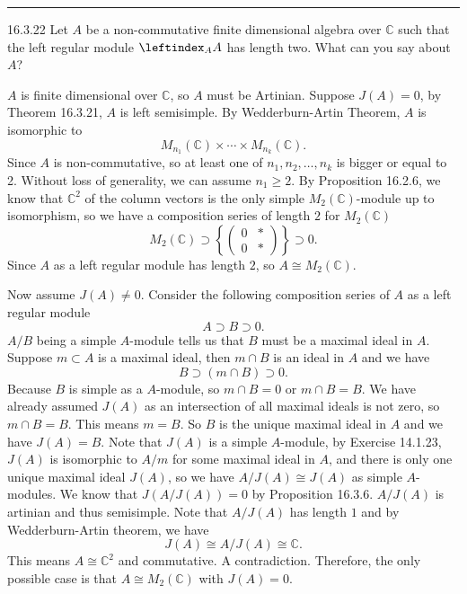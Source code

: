 \documentclass[a4paper, 12pt]{article}
\begin{document}
\noindent\rule{7in}{2.8pt}
\begin{problem}{16.3.22}
Let \(A\) be a non-commutative finite dimensional algebra over \(\mathbb{C}\) such that the left regular module \(\leftindex_A A\) has length two. What can you say about \(A\)?
\end{problem}
\begin{solution}
\(A\) is finite dimensional over \(\mathbb{C}\), so \(A\) must be Artinian. Suppose \(J(A)=0\), by Theorem 16.3.21, \(A\) is left semisimple. By Wedderburn-Artin Theorem, \(A\) is isomorphic to 
\[M_{n_1}(\mathbb{C})\times\cdots\times M_{n_k}(\mathbb{C}).\]
Since \(A\) is non-commutative, so at least one of \(n_1,n_2,\ldots,n_k\) is bigger or equal to 2. Without loss of generality, we can assume \(n_1\geq 2\). By Proposition 16.2.6, we know that \(\mathbb{C}^2\) of the column vectors is the only 
simple \(M_2(\mathbb{C})\)-module up to isomorphism, so we have a composition series of length \(2\) for \(M_2(\mathbb{C})\) 
\[M_2(\mathbb{C})\supset \left\{ \begin{pmatrix}
0&*\\ 
0&*
\end{pmatrix} \right\}\supset 0.\]
Since \(A\) as a left regular module has length \(2\), so \(A\cong M_2(\mathbb{C})\). 

Now assume \(J(A)\neq 0\). Consider the following composition series of \(A\) as a left regular module
\[A\supset B\supset 0.\]
\(A/B\) being a simple \(A\)-module tells us that \(B\) must be a maximal ideal in \(A\). Suppose \(m\subset A\) is a maximal ideal, then \(m\cap B\) is an ideal in \(A\) and we have 
\[B\supset (m\cap B)\supset 0.\]
Because \(B\) is simple as a \(A\)-module, so \(m\cap B=0\) or \(m\cap B=B\). We have already assumed \(J(A)\) as an intersection of all maximal ideals is not zero, so \(m\cap B=B\). This means \(m=B\). So \(B\) is the unique maximal ideal in \(A\) and we have 
\(J(A)=B\). Note that \(J(A)\) is a simple \(A\)-module, by Exercise 14.1.23, \(J(A)\) is isomorphic to \(A/m\) for some maximal ideal in \(A\), and there is only one unique maximal ideal \(J(A)\), so we have 
\(A/J(A)\cong J(A)\) as simple \(A\)-modules. We know that \(J(A/J(A))=0\) by Proposition 16.3.6. \(A/J(A)\) is artinian and thus semisimple. Note that \(A/J(A)\) has length \(1\) and by Wedderburn-Artin theorem, we have 
\[J(A)\cong A/J(A)\cong \mathbb{C}.\]
This means \(A\cong \mathbb{C}^2\) and commutative. A contradiction. Therefore, the only possible case is that \(A\cong M_2(\mathbb{C})\) with \(J(A)=0\).  
\end{solution}
\end{document}
